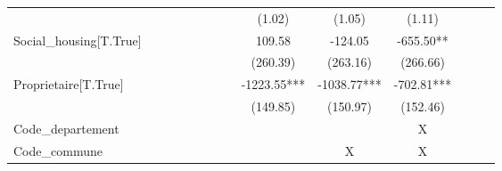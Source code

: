 \begin{subappendices}
{\begin{landscape}
\begin{table}[H]
{\begin{tabular}{lccccccccccccc}
                                         &                    &                         &                                  &             &                          &                   &             & (1.02)               & (1.05)                  & (1.11)                   &                       &                           &                            \\
Social_housing[T.True]                   &                    &                         &                                  &             &                          &                   &             & 109.58               & -124.05                 & -655.50**                &                       &                           &                            \\
                                         &                    &                         &                                  &             &                          &                   &             & (260.39)             & (263.16)                & (266.66)                 &                       &                           &                            \\
Proprietaire[T.True]                     &                    &                         &                                  &             &                          &                   &             & -1223.55***          & -1038.77***             & -702.81***               &                       &                           &                            \\
                                         &                    &                         &                                  &             &                          &                   &             & (149.85)             & (150.97)                & (152.46)                 &                       &                           &                            \\
Code_departement                         &                    &                         &                                  &             &                          &                   &             &                      &                         & X                        &                       &                           &                            \\
Code_commune                             &                    &                         &                                  &             &                          &                   &             &                      & X                       & X                        &                       &                           &                            \\

\end{tabular}}
\end{table}
\end{landscape}}
\end{subappendices}
